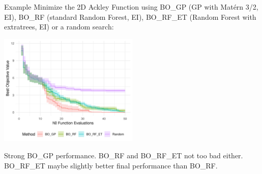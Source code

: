 \documentclass[11pt,compress,t,notes=noshow, xcolor=table]{beamer}
\begin{document}
\begin{frame}{Example}
Minimize the 2D Ackley Function using BO\_GP (GP with Matérn 3/2, EI), BO\_RF (standard Random Forest, EI), BO\_RF\_ET (Random Forest with extratrees, EI) or a random search:
\begin{center}
  \includegraphics[width = 0.5\textwidth]{figure_man/surrogate_2.png}
\end{center}
\begin{footnotesize}
Strong BO\_GP performance. BO\_RF and BO\_RF\_ET not too bad either. BO\_RF\_ET maybe slightly better final performance than BO\_RF.
\end{footnotesize}
\end{frame}

\endlecture
\end{document}

